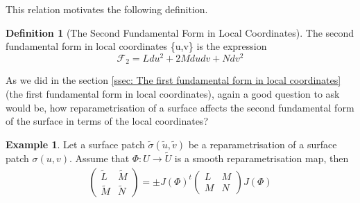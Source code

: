 \documentclass{article}
\theoremstyle{plain}
\theoremstyle{definition}
\newtheorem{definition}{Definition}
\newtheorem{example}{Example}
\theoremstyle{remark}
\begin{document}
This relation motivates the following definition.
\begin{definition}[The Second Fundamental Form in Local Coordinates]
    The second fundamental form in local coordinates \{u,v\} is the expression \[ \mathcal{F}_2 = L du^2 + 2M dudv + N dv^2\]
\end{definition}

As we did in the section \ref{ssec: The first fundamental form in local coordinates} (the first fundamental form in local coordinates), again a good question to ask would be, how reparametrisation of a surface affects the second fundamental form of the surface in terms of the local coordinates?

\begin{example}
    Let a surface patch \( \tilde{\sigma}(\tilde{u}, \tilde{v})\) be a reparametrisation of a surface patch \(\sigma(u,v)\). Assume that \(\Phi: U \rightarrow \tilde{U}\) is a smooth reparametrisation map, then
    \begin{align}
        \begin{pmatrix}
            \tilde{L} & \tilde{M} \\
            \tilde{M} & \tilde{N}
        \end{pmatrix}
        = \pm J(\Phi)^t
        \begin{pmatrix}
            L & M \\
            M & N
        \end{pmatrix}
        J(\Phi)
    \end{align}
\end{example}
\end{document}
